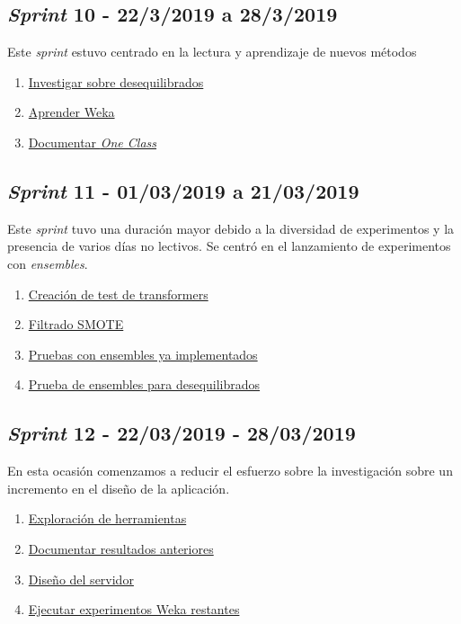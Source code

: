 \subsection{\textit{Sprint} 10 - 22/3/2019 a 28/3/2019}
Este \textit{sprint} estuvo centrado en la lectura y aprendizaje de nuevos métodos

\begin{enumerate}\addtocounter{enumi}{38}
	\item
	\href{https://github.com/joselucross/TFG-SmartBeds/issues/39}{Investigar sobre desequilibrados}
	\item
	\href{https://github.com/joselucross/TFG-SmartBeds/issues/40}{Aprender Weka}
	\item
	\href{https://github.com/joselucross/TFG-SmartBeds/issues/41}{Documentar \textit{One Class}}
\end{enumerate}
\subsection{\textit{Sprint} 11 - 01/03/2019 a 21/03/2019}
Este \textit{sprint} tuvo una duración mayor debido a la diversidad de experimentos y la presencia de varios días no lectivos. Se centró en el lanzamiento de experimentos con \textit{ensembles}.
\begin{enumerate}\addtocounter{enumi}{41}
	\item
	\href{https://github.com/joselucross/TFG-SmartBeds/issues/42}{Creación de test de transformers}
	\item
	\href{https://github.com/joselucross/TFG-SmartBeds/issues/43}{Filtrado SMOTE}
	\item
	\href{https://github.com/joselucross/TFG-SmartBeds/issues/43}{Pruebas con ensembles ya implementados}
	\item
	\href{https://github.com/joselucross/TFG-SmartBeds/issues/45}{Prueba de ensembles para desequilibrados}
\end{enumerate}

\subsection{\textit{Sprint} 12 - 22/03/2019 - 28/03/2019}
En esta ocasión comenzamos a reducir el esfuerzo sobre la investigación sobre un incremento en el diseño de la aplicación.

\begin{enumerate}\addtocounter{enumi}{45}
	\item
	\href{https://github.com/joselucross/TFG-SmartBeds/issues/46}{Exploración de herramientas}
	\item
	\href{https://github.com/joselucross/TFG-SmartBeds/issues/47}{Documentar resultados anteriores}
	\item
	\href{https://github.com/joselucross/TFG-SmartBeds/issues/48}{Diseño del servidor}
	\item
	\href{https://github.com/joselucross/TFG-SmartBeds/issues/49}{Ejecutar experimentos Weka restantes}
\end{enumerate}

